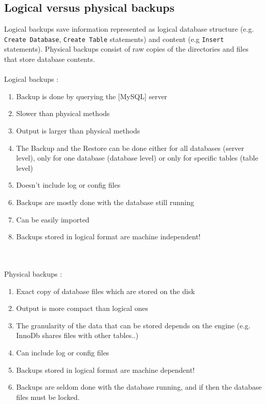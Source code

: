 \documentclass[10pt]{article}
\begin{document}
\subsection{Logical versus physical backups}
Logical backups save information represented as logical database structure (e.g. \texttt{Create Database}, \texttt{Create Table}  statements) and content (e.g \texttt{Insert} statements). Physical backups consist of raw copies of the directories and files that store database contents. \\ \\
Logical backups :
\begin{enumerate}
\item Backup is done by querying the [MySQL] server
\item Slower than physical methods
\item Output is larger than physical methods
\item The Backup and the Restore can be done either for all databases (server level), only for one database (database level) or only for specific tables (table level)
\item Doesn't include log or config files
\item Backups are mostly done with the database still running
\item Can be easily imported
\item Backups stored in logical format are machine independent!
\end{enumerate}\cite{mysqlbackupandrectypesman}
\\ \\Physical backups :
\begin{enumerate}
\item Exact copy of database files which are stored on the disk
\item Output is more compact than logical ones
\item The granularity of the data that can be stored depends on the engine (e.g. InnoDb shares files with other tables..) 
\item Can include log or config files
\item Backups stored in logical format are machine dependent!
\item Backups are seldom done with the database running, and if then the database files must be locked.
\end{enumerate} \cite{mysqlbackupandrectypesman}
\end{document}
